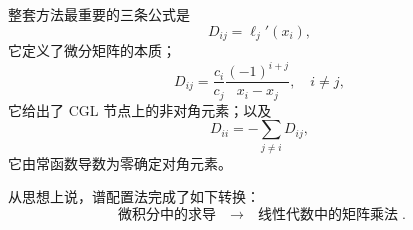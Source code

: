 \documentclass[11pt,a4paper]{ctexart}
\numberwithin{equation}{section}
\begin{document}
整套方法最重要的三条公式是
\begin{equation}
  \boxed{D_{ij}=\ell_j'(x_i)},
\end{equation}
它定义了微分矩阵的本质；
\begin{equation}
  \boxed{
  D_{ij}=\frac{c_i}{c_j}
  \frac{(-1)^{i+j}}{x_i-x_j},\quad i\ne j},
\end{equation}
它给出了 CGL 节点上的非对角元素；以及
\begin{equation}
  \boxed{D_{ii}=-\sum_{j\ne i}D_{ij}},
\end{equation}
它由常函数导数为零确定对角元素。

从思想上说，谱配置法完成了如下转换：
\begin{equation*}
\boxed{\text{微积分中的求导}\quad\longrightarrow\quad\text{线性代数中的矩阵乘法}}.
\end{equation*}
\end{document}
